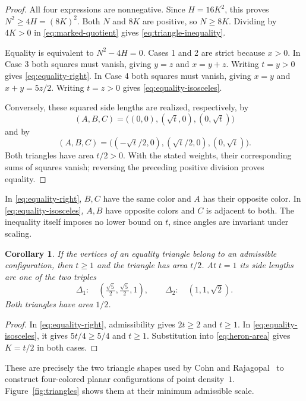 \documentclass[11pt,a4paper]{article}
\newtheorem{corollary}[theorem]{Corollary}
\theoremstyle{definition}
\theoremstyle{remark}
\begin{document}
\begin{proof}
All four expressions are nonnegative. Since $H=16K^2$, this proves
$N^2\geq4H=(8K)^2$. Both $N$ and $8K$ are positive, so $N\geq8K$.
Dividing by $4K>0$ in \eqref{eq:marked-quotient} gives
\eqref{eq:triangle-inequality}.

Equality is equivalent to $N^2-4H=0$. Cases 1 and 2 are strict because
$x>0$. In Case 3 both squares must vanish, giving $y=z$ and $x=y+z$.
Writing $t=y>0$ gives \eqref{eq:equality-right}. In Case 4 both squares
must vanish, giving $x=y$ and $x+y=5z/2$. Writing $t=z>0$ gives
\eqref{eq:equality-isosceles}.

Conversely, these squared side lengths are realized, respectively, by
\[
(A,B,C)=\bigl((0,0),(\sqrt t,0),(0,\sqrt t)\bigr)
\]
and by
\[
(A,B,C)=\bigl((-\sqrt t/2,0),(\sqrt t/2,0),(0,\sqrt t)\bigr).
\]
Both triangles have area $t/2>0$. With the stated weights, their
corresponding sums of squares vanish; reversing the preceding positive
division proves equality.
\end{proof}

In \eqref{eq:equality-right}, $B,C$ have the same color and $A$ has their
opposite color. In \eqref{eq:equality-isosceles}, $A,B$ have opposite colors
and $C$ is adjacent to both. The inequality itself imposes no lower bound
on $t$, since angles are invariant under scaling.

\begin{corollary}
\label{cor:triangle-scale}
If the vertices of an equality triangle belong to an admissible
configuration, then $t\geq1$ and the triangle has area $t/2$.
At $t=1$ its side lengths are one of the two triples
\begin{equation}
\label{eq:two-tiles}
\Delta_1:\quad(\tfrac{\sqrt5}{2},\tfrac{\sqrt5}{2},1),
\qquad
\Delta_2:\quad(1,1,\sqrt2).
\end{equation}
Both triangles have area $1/2$.
\end{corollary}

\begin{proof}
In \eqref{eq:equality-right}, admissibility gives $2t\geq2$ and $t\geq1$.
In \eqref{eq:equality-isosceles}, it gives $5t/4\geq5/4$ and $t\geq1$.
Substitution into \eqref{eq:heron-area} gives $K=t/2$ in both cases.
\end{proof}

These are precisely the two triangle shapes used by Cohn and
Rajagopal~\cite[Section~4.1]{CR} to construct four-colored planar configurations of point density~$1$.
Figure~\ref{fig:triangles} shows them at their minimum admissible scale.
\end{document}
